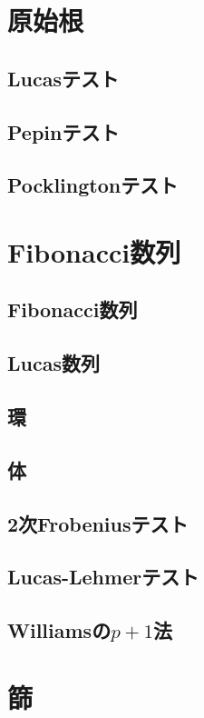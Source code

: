 \section{原始根}
\subsection{Lucasテスト}

\subsection{Pepinテスト}

\subsection{Pocklingtonテスト}


\section{Fibonacci数列}
\subsection{Fibonacci数列}

\subsection{Lucas数列}

\subsection{環}

\subsection{体}

\subsection{2次Frobeniusテスト}

\subsection{Lucas-Lehmerテスト}

\subsection{Williamsの$p+1$法}


\section{篩}
